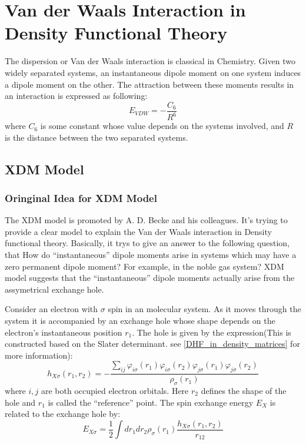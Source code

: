 %
%
\chapter{Van der Waals Interaction in Density Functional Theory}
%
%
The dispersion or Van der Waals interaction is classical in Chemistry. 
Given two widely separated systems, an instantaneous dipole moment on 
one system induces a dipole moment on the other. The attraction between 
these moments results in an interaction is expressed as following:
\begin{equation}
 \label{VDW_DFT_eq:1}
 E_{VDW} = -\frac{C_{6}}{R^{6}}
\end{equation}
where $C_{6}$ is some constant whose value depends on the systems
involved, and $R$ is the distance between the two separated systems.

%
%

\section{XDM Model}
%
%

\subsection{Oringinal Idea for XDM Model}
%
%
%
The XDM model is promoted by A. D. Becke and his colleagues. It's 
trying to provide a clear model to explain the Van der Waals interaction
in Density functional theory. Basically, it trys to give an answer to
the following question, that How do ``instantaneous'' dipole moments arise 
in systems which may have a zero permanent dipole moment? For example, 
in the noble gas system? XDM model suggests that the ``instantaneous'' 
dipole moments actually arise from the assymetrical exchange hole.

Consider an electron with $\sigma$ spin in an molecular system. As it moves 
through the system it is accompanied by an exchange hole whose shape depends 
on the electron’s instantaneous position $r_{1}$. The hole is given by the
expression(This is constructed based on the Slater determinant. 
see \ref{DHF_in_density_matrices} for more information):
\begin{equation}
\label{XDM_exchange_hole}
 h_{X\sigma}(r_{1},r_{2}) = -\frac{
\sum_{ij}\varphi_{i\sigma}(r_{1})\varphi_{i\sigma}(r_{2})\varphi_{j\sigma}(r_{1})
\varphi_{j\sigma}(r_{2})}{\rho_{\sigma}(r_{1})}
\end{equation}
where $i,j$ are both occupied electron orbitals. Here $r_{2}$ defines the shape 
of the hole and $r_{1}$ is called the ``reference'' point. The spin exchange 
energy $E_{X}$ is related to the exchange hole by:
\begin{equation}
 \label{XDM_exchange_energy}
E_{X\sigma} = \frac{1}{2}\int dr_{1}dr_{2} \rho_{\sigma}(r_{1}) 
\frac{h_{X\sigma}(r_{1},r_{2})}{r_{12}}
\end{equation}

